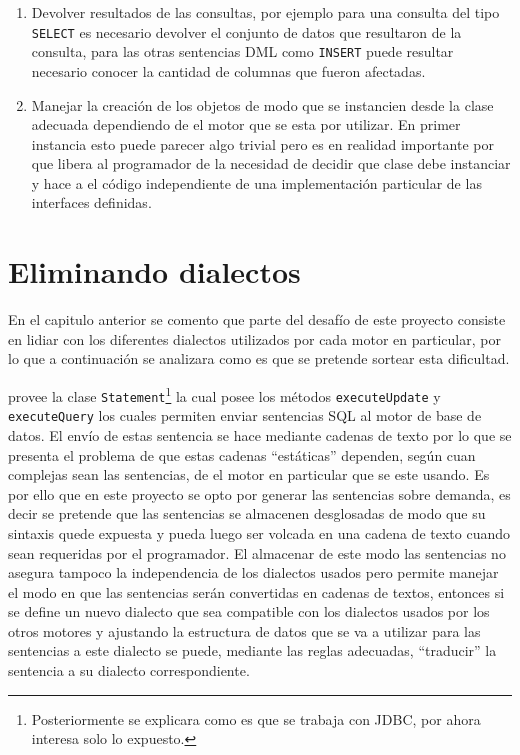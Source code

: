 \begin{enumerate}
%
\item Devolver resultados de las consultas, por ejemplo para una consulta del tipo \verb=SELECT= es necesario devolver el conjunto de datos que resultaron de la consulta, para las otras sentencias DML como \verb=INSERT= puede resultar necesario conocer la cantidad de columnas que fueron afectadas.
%
\item Manejar la creación de los objetos de modo que se instancien desde la clase adecuada dependiendo de el motor que se esta por utilizar. En primer instancia esto puede parecer algo trivial pero es en realidad importante por que libera al programador de la necesidad de decidir que clase debe instanciar y hace a el código independiente de una implementación particular de las interfaces definidas.
\end{enumerate}
%
%
\section{Eliminando dialectos}
\label{seccion:especificacion:dialectos}
En el capitulo anterior se comento que parte del desafío de este proyecto consiste en lidiar con los diferentes  dialectos utilizados por cada motor en particular, por lo que a continuación se analizara como es que se pretende sortear esta dificultad.

\jd provee la clase \verb=Statement=\footnote{Posteriormente se explicara como es que se trabaja con JDBC, por ahora interesa solo lo expuesto.} la cual posee los métodos \verb=executeUpdate= y \verb=executeQuery= los cuales permiten enviar sentencias SQL al motor de base de datos. El envío de estas sentencia se hace mediante cadenas de texto por lo que se presenta el problema de que estas cadenas ``estáticas'' dependen, según cuan complejas sean las sentencias, de el motor en particular que se este usando. Es por ello que en este proyecto se opto por generar las sentencias sobre demanda, es decir se pretende que las sentencias se almacenen desglosadas de modo que su sintaxis quede expuesta y pueda luego ser volcada en una cadena de texto cuando sean requeridas por el programador. El almacenar de este modo las sentencias no asegura tampoco la independencia de los dialectos usados pero permite manejar el modo en que las sentencias serán convertidas en cadenas de textos, entonces si se define un nuevo dialecto que sea compatible con los dialectos usados por los otros motores y ajustando la estructura de datos que se va a utilizar para las sentencias a este dialecto se puede, mediante las reglas adecuadas, ``traducir'' la sentencia a su dialecto correspondiente. 

